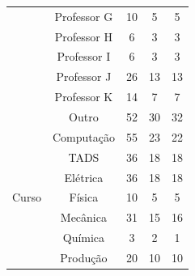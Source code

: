 \begin{table}[ht]
\begin{tabular}{ccccc}
                                        & Professor G              & 10                                        & 5                    & 5                               \\
                                        & Professor H              & 6                                         & 3                    & 3                               \\
                                        & Professor I              & 6                                         & 3                    & 3                               \\
                                        & Professor J              & 26                                        & 13                   & 13                              \\
                                        & Professor K              & 14                                        & 7                    & 7                               \\
                                        & Outro                    & 52                                        & 30                   & 32                              \\
  \hline
  \multirow{9}{*}{Curso}                & Computação               & 55                                        & 23                   & 22                              \\
                                        & TADS                     & 36                                        & 18                   & 18                              \\
                                        & Elétrica                 & 36                                        & 18                   & 18                              \\
                                        & Física                   & 10                                        & 5                    & 5                               \\
                                        & Mecânica                 & 31                                        & 15                   & 16                              \\
                                        & Química                  & 3                                         & 2                    & 1                               \\
                                        & Produção                 & 20                                        & 10                   & 10                              \\

\end{tabular}
\end{table}
